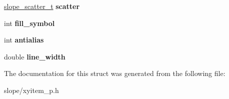 \begin{DoxyCompactItemize}
\item 
\hypertarget{struct__slope__xyitem_afbec1ee0523a97e576b2a369d909c888}{\hyperlink{group__Item_ga7be66725a3a198bcbd9434e6d3ad70c5}{slope\+\_\+scatter\+\_\+t} {\bfseries scatter}}\label{struct__slope__xyitem_afbec1ee0523a97e576b2a369d909c888}

\item 
\hypertarget{struct__slope__xyitem_aa4f942a3bc1907d54158df9912cbfed6}{int {\bfseries fill\+\_\+symbol}}\label{struct__slope__xyitem_aa4f942a3bc1907d54158df9912cbfed6}

\item 
\hypertarget{struct__slope__xyitem_a809b4363b4fae543e0196983bcc99bd4}{int {\bfseries antialias}}\label{struct__slope__xyitem_a809b4363b4fae543e0196983bcc99bd4}

\item 
\hypertarget{struct__slope__xyitem_afa9758ee875e6c37ed250eb0d6cc4d4b}{double {\bfseries line\+\_\+width}}\label{struct__slope__xyitem_afa9758ee875e6c37ed250eb0d6cc4d4b}

\end{DoxyCompactItemize}


The documentation for this struct was generated from the following file\+:\begin{DoxyCompactItemize}
\item 
slope/xyitem\+\_\+p.\+h\end{DoxyCompactItemize}
